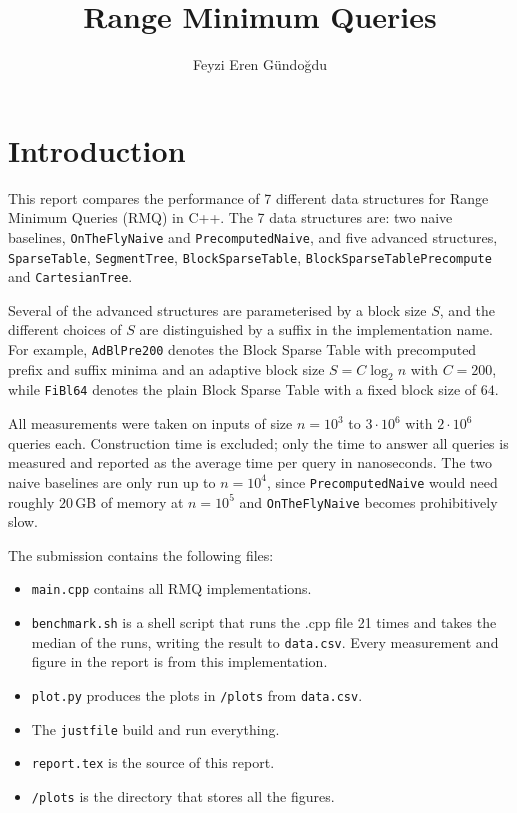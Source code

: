 \documentclass[a4paper,UKenglish,cleveref,thm-restate]{lipics-v2021}
\title{Range Minimum Queries}
\author{Feyzi Eren Gündoğdu}{Karlsruhe Institute of Technology, Germany}{}{}{}
\begin{document}
\maketitle


\section{Introduction}
This report compares the performance of 7 different data structures for Range Minimum Queries (RMQ) in C++.
The 7 data structures are: two naive baselines, \texttt{OnTheFlyNaive} and \texttt{PrecomputedNaive},
and five advanced structures, \texttt{SparseTable}, \texttt{SegmentTree}, \texttt{BlockSparseTable}, \texttt{BlockSparseTablePrecompute}
and \texttt{CartesianTree}.

Several of the advanced structures are parameterised by a block size $S$, and the different choices of $S$ are distinguished by a suffix in the implementation name.
For example, \texttt{AdBlPre200} denotes the Block Sparse Table with precomputed prefix and suffix minima and an adaptive block size $S = C \log_2 n$ with $C = 200$,
while \texttt{FiBl64} denotes the plain Block Sparse Table with a fixed block size of $64$.

All measurements were taken on inputs of size $n = 10^3$ to $3 \cdot 10^6$ with $2 \cdot 10^6$ queries each.
Construction time is excluded; only the time to answer all queries is measured and reported as the average time per query in nanoseconds.
The two naive baselines are only run up to $n = 10^4$, since
\texttt{PrecomputedNaive} would need roughly $20$\,GB of memory at $n = 10^5$ and
\texttt{OnTheFlyNaive} becomes prohibitively slow.

The submission contains the following files:
\begin{itemize}
	\item \texttt{main.cpp} contains all RMQ implementations.
	\item \texttt{benchmark.sh} is a shell script that runs the .cpp file 21 times and takes the median of the runs, writing the result to \texttt{data.csv}. Every measurement and figure in the report is from this implementation.
	\item \texttt{plot.py} produces the plots in \texttt{/plots} from \texttt{data.csv}.
	\item The \texttt{justfile} build and run everything.
	\item \texttt{report.tex} is the source of this report.
	\item \texttt{/plots} is the directory that stores all the figures.
\end{itemize}
\end{document}
